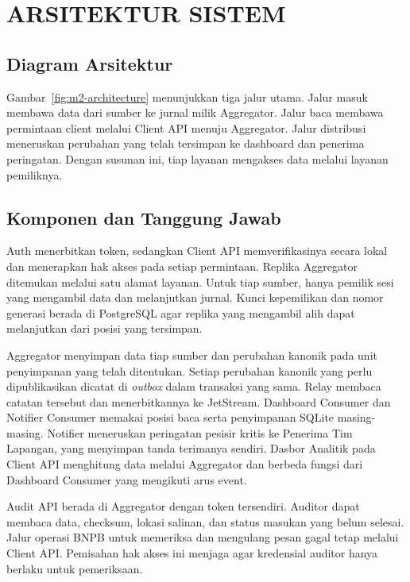 \chapter{ARSITEKTUR SISTEM}

\section{Diagram Arsitektur}
Gambar~\ref{fig:m2-architecture} menunjukkan tiga jalur utama. Jalur masuk membawa data dari sumber ke jurnal milik Aggregator. Jalur baca membawa permintaan client melalui Client API menuju Aggregator. Jalur distribusi meneruskan perubahan yang telah tersimpan ke dashboard dan penerima peringatan. Dengan susunan ini, tiap layanan mengakses data melalui layanan pemiliknya.



\section{Komponen dan Tanggung Jawab}

Auth menerbitkan token, sedangkan Client API memverifikasinya secara lokal dan menerapkan hak akses pada setiap permintaan. Replika Aggregator ditemukan melalui satu alamat layanan. Untuk tiap sumber, hanya pemilik sesi yang mengambil data dan melanjutkan jurnal. Kunci kepemilikan dan nomor generasi berada di PostgreSQL agar replika yang mengambil alih dapat melanjutkan dari posisi yang tersimpan.

Aggregator menyimpan data tiap sumber dan perubahan kanonik pada unit penyimpanan yang telah ditentukan. Setiap perubahan kanonik yang perlu dipublikasikan dicatat di \textit{outbox} dalam transaksi yang sama. Relay membaca catatan tersebut dan menerbitkannya ke JetStream. Dashboard Consumer dan Notifier Consumer memakai posisi baca serta penyimpanan SQLite masing-masing. Notifier meneruskan peringatan pesisir kritis ke Penerima Tim Lapangan, yang menyimpan tanda terimanya sendiri. Dasbor Analitik pada Client API menghitung data melalui Aggregator dan berbeda fungsi dari Dashboard Consumer yang mengikuti arus event.

Audit API berada di Aggregator dengan token tersendiri. Auditor dapat membaca data, checksum, lokasi salinan, dan status masukan yang belum selesai. Jalur operasi BNPB untuk memeriksa dan mengulang pesan gagal tetap melalui Client API. Pemisahan hak akses ini menjaga agar kredensial auditor hanya berlaku untuk pemeriksaan.

